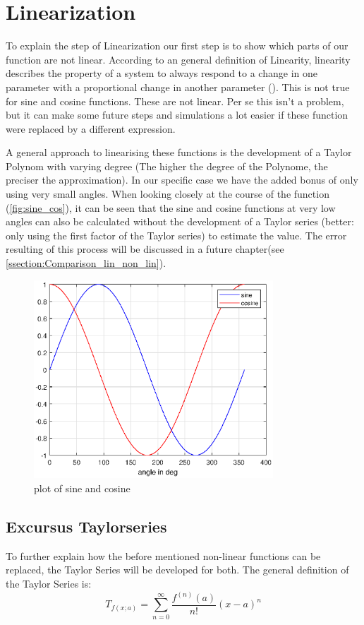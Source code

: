 \section{Linearization}
To explain the step of Linearization our first step is to show which parts of our function are not linear. According to an general definition of Linearity, linearity describes the property of a system to always respond to a change in one parameter with a proportional change in another parameter (\cite{dewiki:Linearity}). This is not true for sine and cosine functions. These are not linear. Per se this isn't a problem, but it can make some future steps and simulations a lot easier if these function were replaced by a different expression.

A general approach to linearising these functions is the development of a Taylor Polynom with varying degree (The higher the degree of the Polynome, the preciser the approximation). In our specific case we have the added bonus of only using very small angles. When looking closely at the course of the function (\autoref{fig:sine_cos}), it can be seen that the sine and cosine functions at very low angles can also be calculated without the development of a Taylor series (better: only using the first factor of the Taylor series) to estimate the value. The error resulting of this process will be discussed in a future chapter(see \autoref{ssection:Comparison_lin_non_lin}).
\begin{figure}[H]
    \centering
    \includegraphics[width=0.8\textwidth]{Lab_report/pics/plots/sin_cos.eps}
    \caption{plot of sine and cosine}
    \label{fig:sine_cos}
\end{figure}
\subsection{Excursus Taylorseries}
To further explain how the before mentioned non-linear functions can be replaced, the Taylor Series will be developed for both. The general definition of the Taylor Series is:
\begin{equation}
      T_{f(x;a)} = \sum^\infty_{n=0} \frac{f^{(n)}(a)}{n!}(x-a)^n
    \label{eq:Taylor_Series}  
\end{equation}
